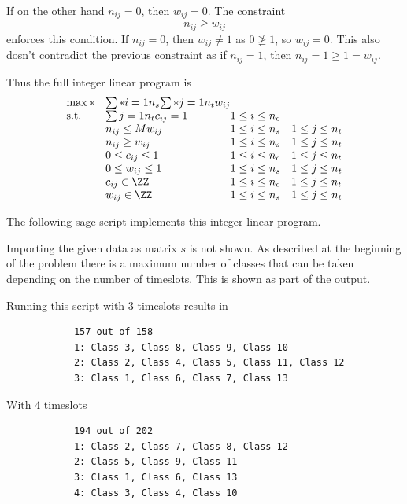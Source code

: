 \documentclass[11pt, oneside]{article}
\begin{document}
\begin{enumerate}
        If on the other hand $n_{ij} = 0$, then $w_{ij} = 0$.
        The constraint
        \[
            n_{ij} \ge w_{ij}
        \]
        enforces this condition.
        If $n_{ij} = 0$, then $w_{ij} \neq 1$ as $0 \ngeq 1$, so $w_{ij} = 0$.
        This also dosn't contradict the previous constraint as if $n_{ij} = 1$,
        then $n_{ij} = 1 \ge 1 = w_{ij}$.

        Thus the full integer linear program is
        \[
            \begin{array}{ll@{}ll}
                \max* & \sum*{i = 1}{n_s}{\sum*{j=1}{n_t}{w_{ij}}} \\
                \text{s.t.} & \sum{j=1}{n_t}{c_{ij}} = 1 \hskip 1em &1 \le i \le n_c \\
                            & n_{ij} \le M w_{ij}         &1 \le i \le n_s \hskip 1em 1 \le j \le n_t\\
                            & n_{ij} \ge w_{ij}           &1 \le i \le n_s \hskip 1em 1 \le j \le n_t \\
                            & 0 \le c_{ij} \le 1          &1 \le i \le n_c \hskip 1em 1 \le j \le n_t \\
                            & 0 \le w_{ij} \le 1          &1 \le i \le n_s \hskip 1em 1 \le j \le n_t \\
                            & c_{ij} \in \ZZ              &1 \le i \le n_c \hskip 1em 1 \le j \le n_t \\
                            & w_{ij} \in \ZZ              &1 \le i \le n_s \hskip 1em 1 \le j \le n_t
            \end{array}
        \]

        The following sage script implements this integer linear program.
        
        Importing the given data as matrix $s$ is not shown.
        As described at the beginning of the problem there is a maximum number
        of classes that can be taken depending on the number of timeslots.
        This is shown as part of the output.

        Running this script with 3 timeslots results in
        \begin{verbatim}
            157 out of 158
            1: Class 3, Class 8, Class 9, Class 10
            2: Class 2, Class 4, Class 5, Class 11, Class 12
            3: Class 1, Class 6, Class 7, Class 13
        \end{verbatim}

        With 4 timeslots
        \begin{verbatim}
            194 out of 202
            1: Class 2, Class 7, Class 8, Class 12
            2: Class 5, Class 9, Class 11
            3: Class 1, Class 6, Class 13
            4: Class 3, Class 4, Class 10
        \end{verbatim}

\end{enumerate}
\end{document}
